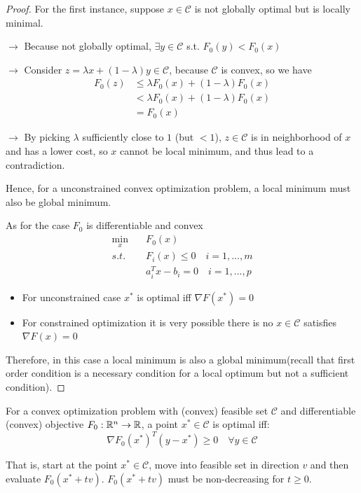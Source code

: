\begin{proof}
    
    For the first instance, suppose $x\in \mathcal{C}$ is not globally optimal but is locally minimal.
	
	$\rightarrow$ Because not globally optimal, $\exists y\in \mathcal{C}$ s.t. $F_0(y)<F_0(x)$
	
	$\rightarrow$ Consider $z = \lambda x + (1-\lambda)y\in \mathcal{C}$, because $\mathcal{C}$ is convex, so we have
	\begin{align*}
	F_0(z) &\leq \lambda F_0(x) + (1-\lambda)F_0(x)\\
	&< \lambda F_0(x) + (1-\lambda)F_0(x)\\
	&= F_0(x)
	\end{align*}
	
	$\rightarrow$ By picking $\lambda$ sufficiently close to $1$ (but $< 1$), $z\in \mathcal{C}$ is in neighborhood of $x$ and has a lower cost, so $x$ cannot be local minimum, and thus lead to a contradiction.
	
	Hence, for a unconstrained convex optimization problem, a local minimum must also be global minimum.
	
	As for the case $F_0$ is differentiable and convex
	\begin{align*}
	\min_x\quad & F_0(x) \\
	s.t.\quad & F_i(x) \leq 0 \quad i = 1,...,m\\
	& a_i^Tx - b_i = 0\quad i = 1,...,p
	\end{align*}

	\begin{itemize}
	\item For unconstrained case $x^*$ is optimal iff $\nabla F(x^*) = 0$
	
	\item For constrained optimization it is very possible there is no $x\in \mathcal{C}$ satisfies $\nabla F(x) = 0$
	\end{itemize}

	Therefore, in this case a local minimum is also a global minimum(recall that first order condition is a necessary condition for a local optimum but not a sufficient condition).
	\end{proof}



\begin{theorem}
	For a convex optimization problem with (convex) feasible set $\mathcal{C}$ and differentiable (convex) objective $F_0: \mathbb{R}^n \rightarrow \mathbb{R}$, a point $x^* \in \mathcal{C}$ is optimal iff:
	\begin{equation*}
	\nabla F_0(x^*)^T(y - x^*) \geq 0  \quad \forall y \in \mathcal{C}
	\end{equation*}

That is, start at the point $x^*\in \mathcal{C}$, move into feasible set in direction $v$ and then evaluate $F_0(x^*+tv)$. $F_0(x^*+tv)$ must be non-decreasing for $t\geq 0$.
\end{theorem}

